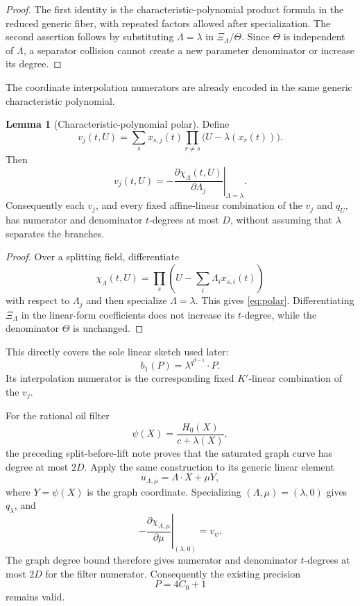 \documentclass[11pt,a4paper]{article}
\theoremstyle{definition}
\newtheorem{lemma}[theorem]{Lemma}
\theoremstyle{remark}
\begin{document}
\begin{proof}
The first identity is the characteristic-polynomial product formula in the reduced generic fiber, with repeated factors allowed after specialization.  The second assertion follows by substituting $\Lambda=\lambda$ in $\Xi_\Lambda/\Theta$.  Since $\Theta$ is independent of $\Lambda$, a separator collision cannot create a new parameter denominator or increase its degree.
\end{proof}

The coordinate interpolation numerators are already encoded in the same generic characteristic polynomial.

\begin{lemma}[Characteristic-polynomial polar]\label{lem:polar}
Define
\[
 v_j(t,U)=\sum_s x_{s,j}(t)
       \prod_{r\ne s}\bigl(U-\lambda(x_r(t))\bigr).
\]
Then
\begin{equation}\label{eq:polar}
 v_j(t,U)
 =-\left.\frac{\partial\chi_\Lambda(t,U)}{\partial\Lambda_j}
   \right|_{\Lambda=\lambda}.
\end{equation}
Consequently each $v_j$, and every fixed affine-linear combination of the $v_j$ and $q_U$, has numerator and denominator $t$-degrees at most $D$, without assuming that $\lambda$ separates the branches.
\end{lemma}

\begin{proof}
Over a splitting field, differentiate
\[
 \chi_\Lambda(t,U)=\prod_s\left(U-\sum_i\Lambda_i x_{s,i}(t)\right)
\]
with respect to $\Lambda_j$ and then specialize $\Lambda=\lambda$.  This gives \eqref{eq:polar}.  Differentiating $\Xi_\Lambda$ in the linear-form coefficients does not increase its $t$-degree, while the denominator $\Theta$ is unchanged.
\end{proof}

This directly covers the sole linear sketch used later:
\[
 b_1(P)=\lambda^{q^{d-1}}\!\cdot P.
\]
Its interpolation numerator is the corresponding fixed $K'$-linear combination of the $v_j$.

For the rational oil filter
\[
 \psi(X)=\frac{H_0(X)}{c+\lambda(X)},
\]
the preceding split-before-lift note proves that the saturated graph curve has degree at most $2D$.  Apply the same construction to its generic linear element
\[
 u_{\Lambda,\mu}=\Lambda\cdot X+\mu Y,
\]
where $Y=\psi(X)$ is the graph coordinate.  Specializing $(\Lambda,\mu)=(\lambda,0)$ gives $q_\lambda$, and
\[
 -\left.\frac{\partial\chi_{\Lambda,\mu}}{\partial\mu}
 \right|_{(\lambda,0)}
 =v_\psi.
\]
The graph degree bound therefore gives numerator and denominator $t$-degrees at most $2D$ for the filter numerator.  Consequently the existing precision
\[
 P=4C_0+1
\]
remains valid.
\end{document}
